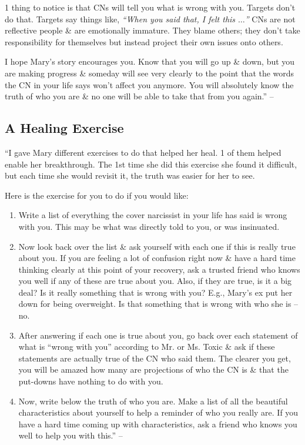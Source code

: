 \documentclass{article}
\numberwithin{equation}{section}
\begin{document}
1 thing to notice is that CNs will tell you what is wrong with you. Targets don't do that. Targets say things like, \textit{``When you said that, I felt this $\ldots$''} CNs are not reflective people \& are emotionally immature. They blame others; they don't take responsibility for themselves but instead project their own issues onto others.

I hope Mary's story encourages you. Know that you will go up \& down, but you are making progress \& someday will see very clearly to the point that the words the CN in your life says won't affect you anymore. You will absolutely know the truth of who you are \& no one will be able to take that from you again.'' -- \cite[pp. 154--156]{Mirza2017}

\subsection{A Healing Exercise}
``I gave Mary different exercises to do that helped her heal. 1 of them helped enable her breakthrough. The 1st time she did this exercise she found it difficult, but each time she would revisit it, the truth was easier for her to see.

Here is the exercise for you to do if you would like:
\begin{enumerate}
	\item Write a list of everything the cover narcissist in your life has said is wrong with you. This may be what was directly told to you, or was insinuated.
	\item Now look back over the list \& ask yourself with each one if this is really true about you. If you are feeling a lot of confusion right now \& have a hard time thinking clearly at this point of your recovery, ask a trusted friend who knows you well if any of these are true about you. Also, if they are true, is it a big deal? Is it really something that is wrong with you? E.g., Mary's ex put her down for being overweight. Is that something that is wrong with who she is -- no.
	\item After answering if each one is true about you, go back over each statement of what is ``wrong with you'' according to Mr. or Ms. Toxic \& ask if these statements are actually true of the CN who said them. The clearer you get, you will be amazed how many are projections of who the CN is \& that the put-downs have nothing to do with you.
	\item Now, write below the truth of who you are. Make a list of all the beautiful characteristics about yourself to help a reminder of who you really are. If you have a hard time coming up with characteristics, ask a friend who knows you well to help you with this.'' -- \cite[p. 156]{Mirza2017}
\end{enumerate}
\end{document}
